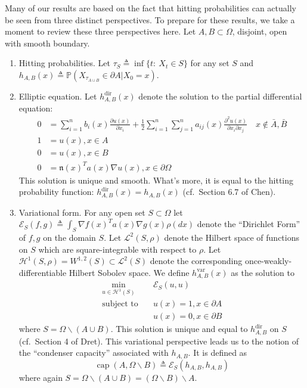 \documentclass[12pt, nofootinbib,english, amsmath, amssymb, aps, priprint, graphicx,floatfix,draft]{revtex4-1}
\theoremstyle{plain}
\theoremstyle{definition}
\theoremstyle{plain}
\newcommand{\normal}{{\mathfrak{n}}}
\newcommand{\capac}[2]{\ensuremath{\operatorname{cap}}(#1,#2)}
\begin{document}
Many of our results are based on the fact that hitting probabilities can actually be seen from three distinct perspectives.  To prepare for these results, we take a moment to review these three perspectives here.  Let $A,B\subset \Omega$, disjoint, open with smooth boundary.

\begin{enumerate}
\item Hitting probabilities.  Let $\tau_S \triangleq \inf\{t:\ X_t \in S\}$ for any set $S$ and $h_{A,B}(x) \triangleq \mathbb{P}(X_{\tau_{A\cup B}}\in \partial A|X_0=x)$.

\item Elliptic equation.  Let $h^\mathrm{dir}_{A,B}(x)$ denote the solution to the partial differential equation:
	    \begin{align}\label{eq:pde}
    0 &= \sum_{i = 1}^n b_i (x) \frac{\partial u
        (x)}{\partial x_i} + \frac{1}{2} \sum_{i = 1}^n \sum_{j = 1}^n a_{ij} (x)
        \frac{\partial^2 u (x)}{\partial x_i \partial x_j}\quad x\notin \bar A,\bar B\\
    1 &= u(x),x\in  A \nonumber \\
    0 &= u(x),x\in  B \nonumber \\
    0 &= \normal(x)^Ta(x)\nabla u(x), x \in \partial{\Omega}
    \nonumber
    \end{align}
This solution is unique and smooth.\cite{lieberman1986mixed}  What's more, it is equal to the hitting probability function: $h^\mathrm{dir}_{A,B}(x)=h_{A,B}(x)$ (cf.\ Section 6.7 of Chen\cite{chen2012symmetric}).
\item Variational form.  For any open set $S\subset \Omega$ let $\mathscr{E}_{S}(f,g)\triangleq \int_S \nabla f(x)^T a(x) \nabla g(x) \rho(dx)$ denote the ``Dirichlet Form'' of $f,g$ on the domain $S$.  Let $\mathscr L^2(S,\rho)$ denote the Hilbert space of functions on $S$ which are square-integrable with respect to $\rho$.  Let $\mathcal{H}^1(S,\rho)=W^{1,2}(S) \subset \mathscr{L}^2(S)$ denote the corresponding once-weakly-differentiable Hilbert Sobolev space.  We define $h^\mathrm{var}_{A,B}(x)$ as the solution to
    \begin{align*}
    \min_{u \in \mathcal H^1(S)} \quad & \mathscr{E}_S(u,u) \\
    \mbox{subject to} \quad & u(x)=1,x\in \partial A \\
     & u(x)=0,x\in \partial B
    \end{align*}
    where $S=\Omega \backslash (A\cup B)$.  This solution is unique and equal to $h^\mathrm{dir}_{A,B}$ on $S$ (cf.\ Section 4 of Dret\cite{dret2016partial}).
This variational perspective leads us to the notion of the ``condenser capacity'' associated with $h_{A,B}$.  It is defined as
    \[
    \capac{A}{\Omega \backslash B} \triangleq \mathscr{E}_S(h_{A,B},h_{A,B})
    \]
    where again $S=\Omega \backslash (A\cup B)=(\Omega \backslash B) \backslash A$.
\end{enumerate}
\end{document}
